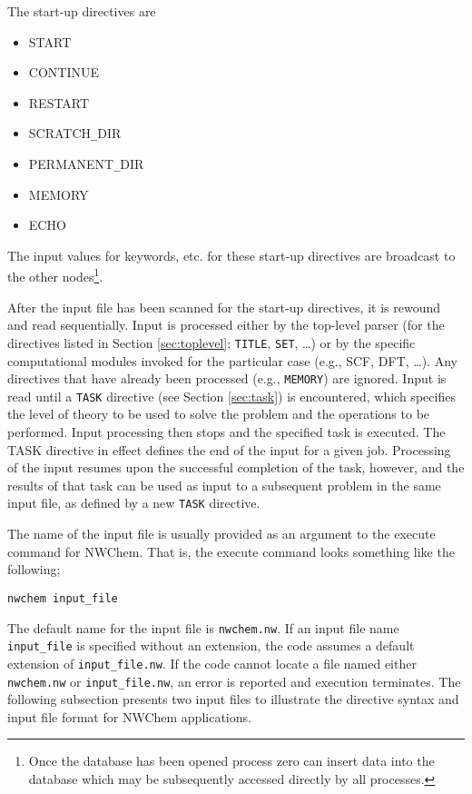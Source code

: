 The start-up directives are

\begin{itemize}
\item START
\item CONTINUE
\item RESTART
\item SCRATCH{\verb+_+}DIR
\item PERMANENT{\verb+_+}DIR
\item MEMORY
\item ECHO


\end{itemize}

The input values for keywords, etc. for these start-up directives are
broadcast to the other nodes\footnote{Once the database has been opened
process zero can insert data into the database which may be
subsequently accessed directly by all processes.}.

After the input file has been scanned for the start-up directives, it
is rewound and read sequentially.  Input is
processed either by the top-level parser (for the directives listed in
Section \ref{sec:toplevel};
\verb+TITLE+, \verb+SET+, \ldots) or by the specific computational modules
invoked for the particular case
(e.g., SCF, DFT, \ldots).  Any directives that have already been processed
(e.g., \verb+MEMORY+) are ignored.  Input is read until a \verb+TASK+
directive (see Section \ref{sec:task}) is encountered, which specifies the 
level of theory to be used to solve the problem and the operations to be 
performed.  Input processing then stops and the specified task is executed.  
The TASK directive in effect defines the end of the input for a given job.  
Processing of the input resumes upon the successful completion of the task,
however, and the results of that task can be used as input to a subsequent
problem in the same input file, as defined by a new \verb+TASK+ directive.

The name of the input file is usually provided as an argument to the execute
command for NWChem.  That is, the execute command looks something like the
following;

\begin{verbatim}
nwchem input_file
\end{verbatim}

The default name for the input file is \verb+nwchem.nw+.  If an input
file name \verb+input_file+ is specified without an extension, the code
assumes a default extension of \verb+input_file.nw+.  If the code cannot
locate a file named either \verb+nwchem.nw+ or \verb+input_file.nw+, an 
error is reported and execution terminates.  The following
subsection presents two input files to illustrate the directive syntax and 
input file format for NWChem applications.

